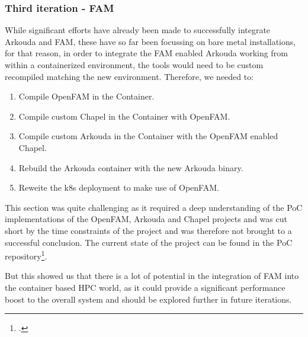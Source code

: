 \subsubsection{Third iteration - \ac{FAM}}
\label{third_iteration_fam}
While significant efforts have already been made to successfully integrate Arkouda and \ac{FAM}, these have so far been focussing on bare metal installations, for that reason, in order to integrate the \ac{FAM} enabled Arkouda working from within a containerized environment, the tools would need to be 
custom recompiled matching the new environment. 
Therefore, we needed to:

\begin{enumerate}
    \item Compile OpenFAM in the Container.
    \item Compile custom Chapel in the Container with OpenFAM.
    \item Compile custom Arkouda in the Container with the OpenFAM enabled Chapel.
    \item Rebuild the Arkouda container with the new Arkouda binary.
    \item Reweite the \ac{k8s} deployment to make use of OpenFAM.
\end{enumerate}

This section was quite challenging as it required a deep understanding of the \ac{PoC} implementations of the OpenFAM, Arkouda and Chapel projects and was cut short by the time constraints of the project and was therefore not brought to a successful conclusion.
The current state of the project can be found in the \ac{PoC} repository\footcite{eckerthProjectRepoMain}. 

But this showed us that there is a lot of potential in the integration of \ac{FAM} into the container based \ac{HPC} world, as it could provide a significant performance boost to the overall system and should be explored further in future iterations.

